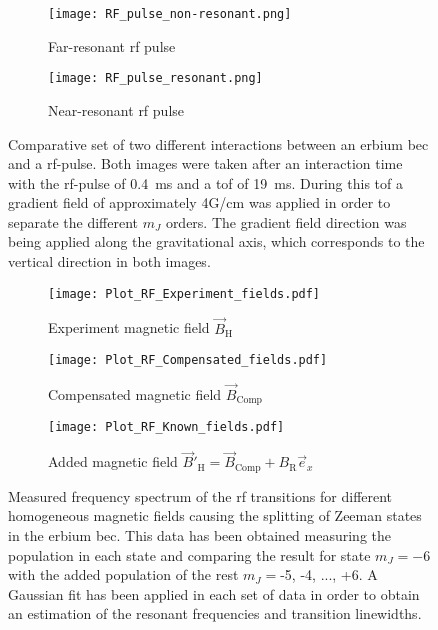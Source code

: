 \begin{figure}[!htbp]
	\centering
	\begin{subfigure}{.5\textwidth}
		\centering
		\texttt{[image: RF\_pulse\_non-resonant.png]}
		\caption{Far-resonant \ac{rf} pulse}
		\label{fig:RF_pulse_non-resonant}
	\end{subfigure}%
	\begin{subfigure}{.5\textwidth}
		\centering
		\texttt{[image: RF\_pulse\_resonant.png]}
		\caption{Near-resonant \ac{rf} pulse}
		\label{fig:RF_pulse_resonant}
	\end{subfigure}
	\caption[Comparative set of two different interactions between an erbium \ac{bec} and a \ac{rf}-pulse.]{Comparative set of two different interactions between an erbium \ac{bec} and a \ac{rf}-pulse. Both images were taken after an interaction time with the \ac{rf}-pulse of \SI{0.4}{\milli\second} and a \ac{tof} of \SI{19}{\milli\second}. During this \acl{tof} a gradient field of approximately 4G/cm was applied in order to separate the different $m_J$ orders. The gradient field direction was being applied along the gravitational axis, which corresponds to the vertical direction in both images.}
	\label{fig:RF_pulse}
\end{figure}



\begin{figure}[!htbp]
	\centering
	\begin{subfigure}{1.\textwidth}
		\centering
		\label{fig:Plot_RF_Experiment_fields}
		\texttt{[image: Plot\_RF\_Experiment\_fields.pdf]}
		\caption{Experiment magnetic field $\vec{B}_\text{H}$}
	\end{subfigure}%
	\hfill
	\vspace{0.2cm}
	\begin{subfigure}{1.\textwidth}
		\centering
		\label{fig:Plot_RF_Compensated_fields}
		\texttt{[image: Plot\_RF\_Compensated\_fields.pdf]}
		\caption{Compensated magnetic field $\vec{B}_\text{Comp}$}
	\end{subfigure}
	\hfill
	\vspace{0.2cm}
	\begin{subfigure}{1.\textwidth}
		\centering
		\label{fig:Plot_RF_Known_fields}
		\texttt{[image: Plot\_RF\_Known\_fields.pdf]}
		\caption{Added magnetic field $\vec{B}'_\text{H} = \vec{B}_\text{Comp} +B_\text{R}\vec{e}_x$}
	\end{subfigure}
	\caption[Measured frequency spectrum of the \ac{rf} transitions for different homogeneous magnetic fields causing the splitting of Zeeman states in the erbium \ac{bec}]{Measured frequency spectrum of the \ac{rf} transitions for different homogeneous magnetic fields causing the splitting of Zeeman states in the erbium \ac{bec}. This data has been obtained measuring the population in each state and comparing the result for state $m_J = -6$ with the added population of the rest $m_J = $-5, -4, ..., +6. A Gaussian fit has been applied in each set of data in order to obtain an estimation of the resonant frequencies and transition linewidths.}
	\label{fig:Plot_RF_All_fields}
\end{figure}

